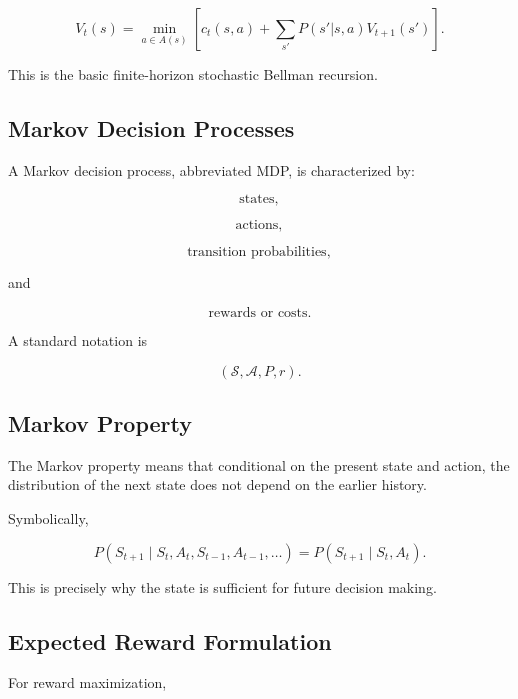 \[
\boxed{
V_t(s)
=
\min_{a\in A(s)}
\left[
c_t(s,a)
+
\sum_{s'}
P(s'|s,a)
V_{t+1}(s')
\right].
}
\]

This is the basic finite-horizon stochastic Bellman recursion.

\subsection{Markov Decision Processes}
\label{subsec:markov-decision-processes}

A Markov decision process, abbreviated MDP, is characterized by:

\[
\boxed{
\text{states},
}
\]

\[
\boxed{
\text{actions},
}
\]

\[
\boxed{
\text{transition probabilities},
}
\]

and

\[
\boxed{
\text{rewards or costs}.
}
\]

A standard notation is

\[
\boxed{
(\mathcal{S},\mathcal{A},P,r).
}
\]

\subsection{Markov Property}
\label{subsec:mdp-markov-property}

The Markov property means that conditional on the present state and
action, the distribution of the next state does not depend on the earlier
history.

Symbolically,

\[
\boxed{
P
(
S_{t+1}
\mid
S_t,A_t,S_{t-1},A_{t-1},\ldots
)
=
P
(
S_{t+1}
\mid
S_t,A_t
).
}
\]

This is precisely why the state is sufficient for future decision making.

\subsection{Expected Reward Formulation}
\label{subsec:mdp-expected-reward}

For reward maximization,

